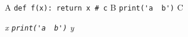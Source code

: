 \documentclass[12pt]{article}
\begin{document}
A \lstinline{def f(x): return x # c} B \lstinline{print('a  b')} C

\emph{x \lstinline{print('a  b')} y}
\end{document}
